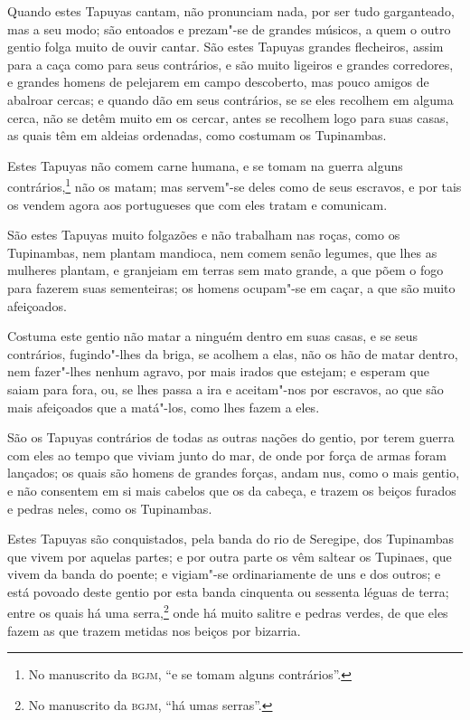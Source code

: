 Quando estes Tapuyas cantam, não pronunciam nada, por ser tudo garganteado, mas a seu
modo; são entoados e prezam"-se de grandes músicos, a quem o outro gentio folga muito de
ouvir cantar. São estes Tapuyas grandes flecheiros, assim para a caça como para seus
contrários, e são muito ligeiros e grandes corredores, e grandes homens de pelejarem em
campo descoberto, mas pouco amigos de abalroar cercas; e quando dão em seus contrários, se
se eles recolhem em alguma cerca, não se detêm muito em os cercar, antes se recolhem logo
para suas casas, as quais têm em aldeias ordenadas, como costumam os Tupinambas.

Estes Tapuyas não comem carne humana, e se tomam na guerra alguns contrários,\footnote{ No
manuscrito da \textsc{bgjm}, ``e se tomam alguns contrários''.} não os matam; mas
servem"-se deles como de seus escravos, e por tais os vendem agora aos portugueses que com
eles tratam e comunicam.

São estes Tapuyas muito folgazões e não trabalham nas roças, como os Tupinambas, nem
plantam mandioca, nem comem senão legumes, que lhes as mulheres plantam, e granjeiam em
terras sem mato grande, a que põem o fogo para fazerem suas sementeiras; os homens
ocupam"-se em caçar, a que são muito afeiçoados.

Costuma este gentio não matar a ninguém dentro em suas casas, e se seus contrários,
fugindo"-lhes da briga, se acolhem a elas, não os hão de matar dentro, nem fazer"-lhes
nenhum agravo, por mais irados que estejam; e esperam que saiam para fora, ou, se lhes
passa a ira e aceitam"-nos por escravos, ao que são mais afeiçoados que a matá"-los, como
lhes fazem a eles.

São os Tapuyas contrários de todas as outras nações do gentio, por terem guerra com eles
ao tempo que viviam junto do mar, de onde por força de armas foram lançados; os quais são
homens de grandes forças, andam nus, como o mais gentio, e não consentem em si mais
cabelos que os da cabeça, e trazem os beiços furados e pedras neles, como os Tupinambas.

Estes Tapuyas são conquistados, pela banda do rio de Seregipe, dos Tupinambas que vivem
por aquelas partes; e por outra parte os vêm saltear os Tupinaes, que vivem da banda do
poente; e vigiam"-se ordinariamente de uns e dos outros; e está povoado deste gentio por
esta banda cinquenta ou sessenta léguas de terra; entre os quais há uma serra,\footnote{
No manuscrito da \textsc{bgjm}, ``há umas serras''.} onde há muito salitre e pedras
verdes, de que eles fazem as que trazem metidas nos beiços por bizarria.

